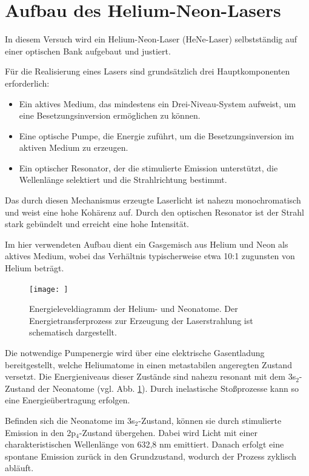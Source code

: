 \section{Aufbau des Helium-Neon-Lasers} \label{aufbau helium neon laser}

In diesem Versuch wird ein Helium-Neon-Laser (HeNe-Laser) selbstständig auf einer optischen Bank aufgebaut und justiert.

Für die Realisierung eines Lasers sind grundsätzlich drei Hauptkomponenten erforderlich:

\begin{itemize}
    \item Ein aktives Medium, das mindestens ein Drei-Niveau-System aufweist, um eine Besetzungsinversion ermöglichen zu können. \\
    \item Eine optische Pumpe, die Energie zuführt, um die Besetzungsinversion im aktiven Medium zu erzeugen. \\
    \item Ein optischer Resonator, der die stimulierte Emission unterstützt, die Wellenlänge selektiert und die Strahlrichtung bestimmt.
\end{itemize}

Das durch diesen Mechanismus erzeugte Laserlicht ist nahezu monochromatisch und weist eine hohe Kohärenz auf. 
Durch den optischen Resonator ist der Strahl stark gebündelt und erreicht eine hohe Intensität.

Im hier verwendeten Aufbau dient ein Gasgemisch aus Helium und Neon als aktives Medium, wobei das Verhältnis typischerweise etwa 10:1 zugunsten von Helium beträgt.


\FloatBarrier
\begin{figure}[htbp]
\centering
\texttt{[image: ]}
\caption{Energieleveldiagramm der Helium- und Neonatome. Der Energietransferprozess zur Erzeugung der Laserstrahlung ist schematisch dargestellt.}
\label{fig:He-Ne}
\end{figure}
\FloatBarrier

Die notwendige Pumpenergie wird über eine elektrische Gasentladung bereitgestellt, welche Heliumatome in einen metastabilen angeregten Zustand versetzt. 
Die Energieniveaus dieser Zustände sind nahezu resonant mit dem 3s$_2$-Zustand der Neonatome (vgl. Abb. \ref{fig:He-Ne}). 
Durch inelastische Stoßprozesse kann so eine Energieübertragung erfolgen.

Befinden sich die Neonatome im 3s$_2$-Zustand, können sie durch stimulierte Emission in den 2p$_4$-Zustand übergehen. 
Dabei wird Licht mit einer charakteristischen Wellenlänge von 632,8 nm emittiert. 
Danach erfolgt eine spontane Emission zurück in den Grundzustand, wodurch der Prozess zyklisch abläuft.

